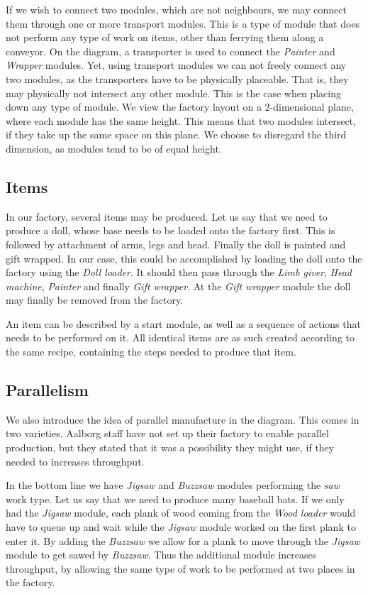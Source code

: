 If we wish to connect two modules, which are not neighbours, we may connect them through one or more transport modules. This is a type of module that does not perform any type of work on items, other than ferrying them along a conveyor. On the diagram, a transporter is used to connect the \textit{Painter} and \textit{Wrapper} modules. Yet, using transport modules we can not freely connect any two modules, as the transporters have to be physically placeable. That is, they may physically not intersect any other module. This is the case when placing down any type of module. We view the factory layout on a 2-dimensional plane, where each module has the same height. This means that two modules intersect, if they take up the same space on this plane. We choose to disregard the third dimension, as modules tend to be of equal height. 

\subsection{Items}
In our factory, several items may be produced. Let us say that we need to produce a doll, whose base needs to be loaded onto the factory first. This is followed by attachment of arms, legs and head. Finally the doll is painted and gift wrapped. In our case, this could be accomplished by loading the doll onto the factory using the \textit{Doll loader}. It should then pass through the \textit{Limb giver}, \textit{Head machine}, \textit{Painter} and finally \textit{Gift wrapper}. At the \textit{Gift wrapper} module the doll may finally be removed from the factory.

An item can be described by a start module, as well as a sequence of actions that needs to be performed on it. All identical items are as such created according to the same recipe, containing the steps needed to produce that item. 

\subsection{Parallelism}
We also introduce the idea of parallel manufacture in the diagram. This comes in two varieties. Aalborg staff have not set up their factory to enable parallel production, but they stated that it was a possibility they might use, if they needed to increases throughput.

In the bottom line we have \textit{Jigsaw} and \textit{Buzzsaw} modules performing the \textit{saw} work type. Let us say that we need to produce many baseball bats. If we only had the \textit{Jigsaw} module, each plank of wood coming from the \textit{Wood loader} would have to queue up and wait while the \textit{Jigsaw} module worked on the first plank to enter it. By adding the \textit{Buzzsaw} we allow for a plank to move through the \textit{Jigsaw} module to get sawed by \textit{Buzzsaw}. Thus the additional module increases throughput, by allowing the same type of work to be performed at two places in the factory. 

